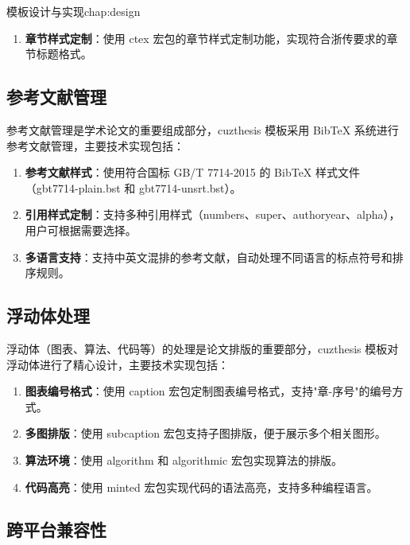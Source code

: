 \begin{cuzchapter}{模板设计与实现}{chap:design}
\begin{enumerate}
        \item \textbf{章节样式定制}：使用 ctex 宏包的章节样式定制功能，实现符合浙传要求的章节标题格式。
    \end{enumerate}

    \subsection{参考文献管理}

    参考文献管理是学术论文的重要组成部分，cuzthesis 模板采用 BibTeX 系统进行参考文献管理，主要技术实现包括：

    \begin{enumerate}
        \item \textbf{参考文献样式}：使用符合国标 GB/T 7714-2015 的 BibTeX 样式文件（gbt7714-plain.bst 和 gbt7714-unsrt.bst）。

        \item \textbf{引用样式定制}：支持多种引用样式（numbers、super、authoryear、alpha），用户可根据需要选择。

        \item \textbf{多语言支持}：支持中英文混排的参考文献，自动处理不同语言的标点符号和排序规则。
    \end{enumerate}

    \subsection{浮动体处理}

    浮动体（图表、算法、代码等）的处理是论文排版的重要部分，cuzthesis 模板对浮动体进行了精心设计，主要技术实现包括：

    \begin{enumerate}
        \item \textbf{图表编号格式}：使用 caption 宏包定制图表编号格式，支持"章-序号"的编号方式。

        \item \textbf{多图排版}：使用 subcaption 宏包支持子图排版，便于展示多个相关图形。

        \item \textbf{算法环境}：使用 algorithm 和 algorithmic 宏包实现算法的排版。

        \item \textbf{代码高亮}：使用 minted 宏包实现代码的语法高亮，支持多种编程语言。
    \end{enumerate}

    \subsection{跨平台兼容性}


\end{cuzchapter}
